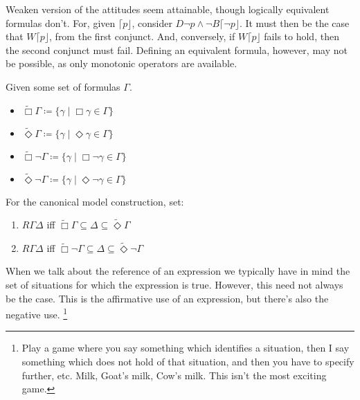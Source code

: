 \documentclass[10pt]{article}
\newcommand{\lattn}{\ensuremath{\lceil}}
\newcommand{\rattn}{\ensuremath{\rfloor}}
\newcommand{\attn}[1]{\ensuremath{\mathord{\lattn{#1}\rattn}}}
\begin{document}
\begin{note}
  Weaken version of the attitudes seem attainable, though logically equivalent formulas don't.
  For, given \(\attn{p}\), consider \(D\lnot p \land \lnot B\attn{\lnot p}\).
  It must then be the case that \(W\attn{p}\), from the first conjunct.
  And, conversely, if \(W\attn{p}\) fails to hold, then the second conjunct must fail.
  Defining an equivalent formula, however, may not be possible, as only monotonic operators are available.
\end{note}

\begin{definition}
  Given some set of formulas \(\Gamma\).
  \begin{itemize}
  \item \(\widetilde{\Box}\Gamma \coloneq \{ \gamma \mid \Box\gamma \in \Gamma \}\)
  \item \(\widetilde{\Diamond}\Gamma \coloneq \{ \gamma \mid \Diamond\gamma \in \Gamma \}\)
  \item \(\widetilde{\Box}\lnot\Gamma \coloneq \{ \gamma \mid \Box\lnot\gamma \in \Gamma \}\)
  \item \(\widetilde{\Diamond}\lnot\Gamma \coloneq \{ \gamma \mid \Diamond\lnot\gamma \in \Gamma \}\)
  \end{itemize}
\end{definition}

For the canonical model construction, set:
\begin{enumerate}
\item \(R\Gamma\Delta\) iff \(\widetilde{\Box}\Gamma \subseteq \Delta \subseteq \widetilde{\Diamond}\Gamma\)
\item \(R\Gamma\Delta\) iff \(\widetilde{\Box}\lnot\Gamma \subseteq \Delta \subseteq \widetilde{\Diamond}\lnot\Gamma\)
\end{enumerate}

\newpage

\hfill
\printbibliography

\newpage

When we talk about the reference of an expression we typically have in mind the set of situations for which the expression is true.
However, this need not always be the case.
This is the affirmative use of an expression, but there's also the negative use.\nolinebreak
\footnote{Play a game where you say something which identifies a situation, then I say something which does not hold of that situation, and then you have to specify further, etc.
  Milk, Goat's milk, Cow's milk.
  This isn't the most exciting game.}
\end{document}
